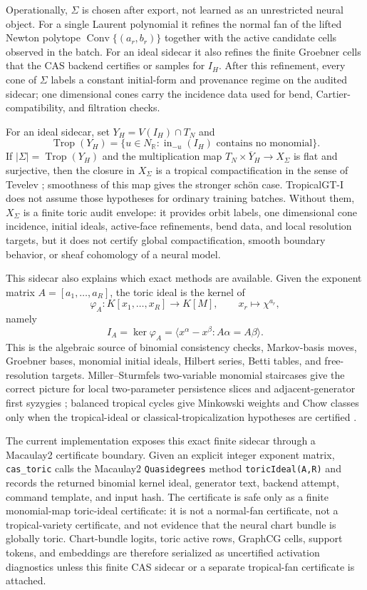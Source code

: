 \documentclass[11pt]{article}
\newcommand{\Conv}{\operatorname{Conv}}
\begin{document}
Operationally, $\Sigma$ is chosen after export, not learned as an unrestricted neural object.  For a single Laurent polynomial it refines the normal fan of the lifted Newton polytope $\Conv\{(a_r,b_r)\}$ together with the active candidate cells observed in the batch.  For an ideal sidecar it also refines the finite Groebner cells that the CAS backend certifies or samples for $I_H$.  After this refinement, every cone of $\Sigma$ labels a constant initial-form and provenance regime on the audited sidecar; one dimensional cones carry the incidence data used for bend, Cartier-compatibility, and filtration checks.

For an ideal sidecar, set $Y_H=V(I_H)\cap T_N$ and
\[
  \operatorname{Trop}(Y_H)=\{u\in N_\mathbb R:\operatorname{in}_{-u}(I_H)\text{ contains no monomial}\}.
\]
If $|\Sigma|=\operatorname{Trop}(Y_H)$ and the multiplication map $T_N\times\overline Y_H\to X_\Sigma$ is flat and surjective, then the closure in $X_\Sigma$ is a tropical compactification in the sense of Tevelev \cite{tevelev2007compactifications}; smoothness of this map gives the stronger sch\"on case.  TropicalGT-I does not assume those hypotheses for ordinary training batches.  Without them, $X_\Sigma$ is a finite toric audit envelope: it provides orbit labels, one dimensional cone incidence, initial ideals, active-face refinements, bend data, and local resolution targets, but it does not certify global compactification, smooth boundary behavior, or sheaf cohomology of a neural model.

This sidecar also explains which exact methods are available.  Given the exponent matrix $A=[a_1,\ldots,a_R]$, the toric ideal is the kernel of
\[
  \varphi_A:K[x_1,\ldots,x_R]\longrightarrow K[M],\qquad x_r\longmapsto \chi^{a_r},
\]
namely
\[
  I_A=\ker\varphi_A=\langle x^\alpha-x^\beta:A\alpha=A\beta\rangle.
\]
This is the algebraic source of binomial consistency checks, Markov-basis moves, Groebner bases, monomial initial ideals, Hilbert series, Betti tables, and free-resolution targets.  Miller--Sturmfels two-variable monomial staircases give the correct picture for local two-parameter persistence slices and adjacent-generator first syzygies \cite{miller2005}; balanced tropical cycles give Minkowski weights and Chow classes only when the tropical-ideal or classical-tropicalization hypotheses are certified \cite{maclaganrincon2018tropicalideals,maclaganrincon2020balanced,fultonsturmfels1994intersection,katz2009tropicalintersection}.

The current implementation exposes this exact finite sidecar through a Macaulay2 certificate boundary.  Given an explicit integer exponent matrix, \texttt{cas\_toric} calls the Macaulay2 \texttt{Quasidegrees} method \texttt{toricIdeal(A,R)} and records the returned binomial kernel ideal, generator text, backend attempt, command template, and input hash.  The certificate is safe only as a finite monomial-map toric-ideal certificate: it is not a normal-fan certificate, not a tropical-variety certificate, and not evidence that the neural chart bundle is globally toric.  Chart-bundle logits, toric active rows, GraphCG cells, support tokens, and embeddings are therefore serialized as uncertified activation diagnostics unless this finite CAS sidecar or a separate tropical-fan certificate is attached.
\end{document}
